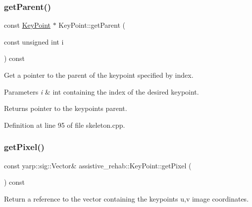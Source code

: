 \subsubsection{\texorpdfstring{getParent()}{getParent()}}
{\footnotesize\ttfamily const \mbox{\hyperlink{classassistive__rehab_1_1KeyPoint}{Key\+Point}} $\ast$ Key\+Point\+::get\+Parent (\begin{DoxyParamCaption}\item[{const unsigned int}]{i }\end{DoxyParamCaption}) const}



Get a pointer to the parent of the keypoint specified by index. 


\begin{DoxyParams}{Parameters}
{\em i} & int containing the index of the desired keypoint. \\
\hline
\end{DoxyParams}
\begin{DoxyReturn}{Returns}
pointer to the keypoint\textquotesingle{}s parent. 
\end{DoxyReturn}


Definition at line 95 of file skeleton.\+cpp.


\begin{DoxyCode}{0}

\end{DoxyCode}
\mbox{\label{classassistive__rehab_1_1KeyPoint_afebdf9ab021c866f00a2e8a3f9fc4c11}} 
\subsubsection{\texorpdfstring{getPixel()}{getPixel()}}
{\footnotesize\ttfamily const yarp\+::sig\+::\+Vector\& assistive\+\_\+rehab\+::\+Key\+Point\+::get\+Pixel (\begin{DoxyParamCaption}{ }\end{DoxyParamCaption}) const\hspace{0.3cm}{\ttfamily [inline]}}



Return a reference to the vector containing the keypoint\textquotesingle{}s u,v image coordinates. 

